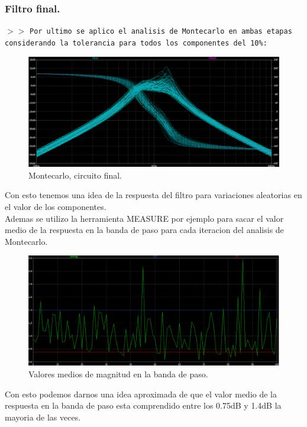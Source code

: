 \subsubsection{Filtro final.}

\noindent $>>$ \texttt{Por ultimo se aplico el analisis de Montecarlo en ambas etapas considerando la tolerancia para todos los componentes del 10\%:}

\begin{figure}[H]
    \centering
    \includegraphics[scale=.3]{Secciones/Circ1/img/mtcarloFinal.png}
    \caption{Montecarlo, circuito final.}
    \label{prop}
\end{figure}

Con esto tenemos una idea de la respuesta del filtro para variaciones aleatorias en el valor de los componentes. \\

Ademas se utilizo la herramienta MEASURE por ejemplo para sacar el valor medio de la respuesta en la banda de paso para cada iteracion del analisis de Montecarlo.

\begin{figure}[H]
    \centering
    \includegraphics[scale=.3]{Secciones/Circ1/img/mtcarloAvg.png}
    \caption{Valores medios de magnitud en la banda de paso.}
    \label{prop}
\end{figure}

Con esto podemos darnos una idea aproximada de que el valor medio de la respuesta en la banda de paso esta comprendido entre los 0.75dB y 1.4dB la mayoria de las veces.

